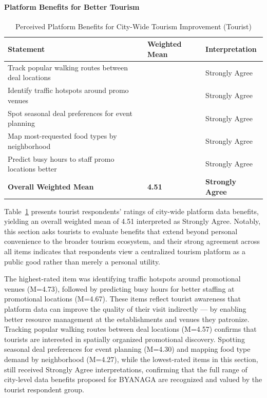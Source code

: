 \documentclass{research}
\begin{document}
\paragraph{Platform Benefits for Better Tourism}

\begin{table}[h]
\centering
\caption{Perceived Platform Benefits for City-Wide Tourism Improvement (Tourist)}
\label{tab:tourist_platform_benefits}
\begin{tabularx}{\textwidth}{>{\raggedright\arraybackslash}X>{\centering\arraybackslash}p{2.5cm}>{\centering\arraybackslash}p{3cm}}
\toprule
\textbf{Statement} & \textbf{Weighted Mean} & \textbf{Interpretation} \\
\midrule
Track popular walking routes between deal locations & 4.57 & Strongly Agree \\
Identify traffic hotspots around promo venues & 4.73 & Strongly Agree \\
Spot seasonal deal preferences for event planning & 4.30 & Strongly Agree \\
Map most-requested food types by neighborhood & 4.27 & Strongly Agree \\
Predict busy hours to staff promo locations better & 4.67 & Strongly Agree \\
\midrule
\textbf{Overall Weighted Mean} & \textbf{4.51} & \textbf{Strongly Agree} \\
\bottomrule
\end{tabularx}
\end{table}

Table~\ref{tab:tourist_platform_benefits} presents tourist respondents' ratings 
of city-wide platform data benefits, yielding an overall weighted mean of 4.51 
interpreted as Strongly Agree. Notably, this section asks tourists to evaluate 
benefits that extend beyond personal convenience to the broader tourism 
ecosystem, and their strong agreement across all items indicates that respondents 
view a centralized tourism platform as a public good rather than merely a 
personal utility.

The highest-rated item was identifying traffic hotspots around promotional 
venues (M=4.73), followed by predicting busy hours for better staffing at 
promotional locations (M=4.67). These items reflect tourist awareness that 
platform data can improve the quality of their visit indirectly --- by enabling 
better resource management at the establishments and venues they patronize. 
Tracking popular walking routes between deal locations (M=4.57) confirms that 
tourists are interested in spatially organized promotional discovery. Spotting 
seasonal deal preferences for event planning (M=4.30) and mapping food type 
demand by neighborhood (M=4.27), while the lowest-rated items in this section, 
still received Strongly Agree interpretations, confirming that the full range of 
city-level data benefits proposed for BYANAGA are recognized and valued by the 
tourist respondent group.
\end{document}
